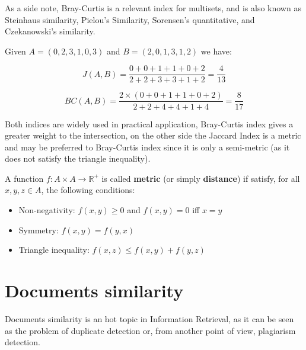 As a side note, Bray-Curtis is a relevant index for multisets, and is also known as Steinhaus similarity, Pielou's Similarity, Sorensen's quantitative, and Czekanowski's similarity.\cite{legendre1998numerical}

\begin{esempio}
	Given $A = (0, 2, 3, 1, 0, 3) $ and $B = (2, 0, 1, 3, 1, 2)$ we have:
	
	\begin{equation}
	J(A,B) = \frac{0 + 0 + 1 + 1 + 0 + 2}{2 + 2 + 3 + 3 + 1 + 2} = \frac{4}{13} 
	\end{equation}
	
	\begin{equation}
	BC(A,B) = \frac{2 \times (0 + 0 + 1 + 1 + 0 + 2) }{2 + 2 + 4 + 4 + 1 + 4} = \frac{8}{17}
	\end{equation}
\end{esempio}

Both indices are widely used in practical application, Bray-Curtis index gives a greater weight to the intersection, on the other side the Jaccard Index is a metric and may be preferred to Bray-Curtis index since it is only a semi-metric (as it does not satisfy the triangle inequality). 

\begin{definizione}
	A function $f : A \times A \rightarrow \mathbb{R}^{+} $ is called \textbf{metric} (or simply \textbf{distance}) if satisfy, for all $x, y, z \in A$, the following conditions:
	\begin{itemize}
		\item Non-negativity: $f(x,y) \geq 0$ and $f(x,y) = 0$ iff $x = y$
		\item Symmetry: $f(x, y) = f(y, x)$
		\item Triangle inequality: $f(x, z) \leq f(x, y) + f(y, z)$
	\end{itemize}
\end{definizione}

\section{Documents similarity}

Documents similarity is an hot topic in Information Retrieval, as it can be seen as the problem of duplicate detection\cite{Broder2000} or, from another point of view, plagiarism detection.\\

